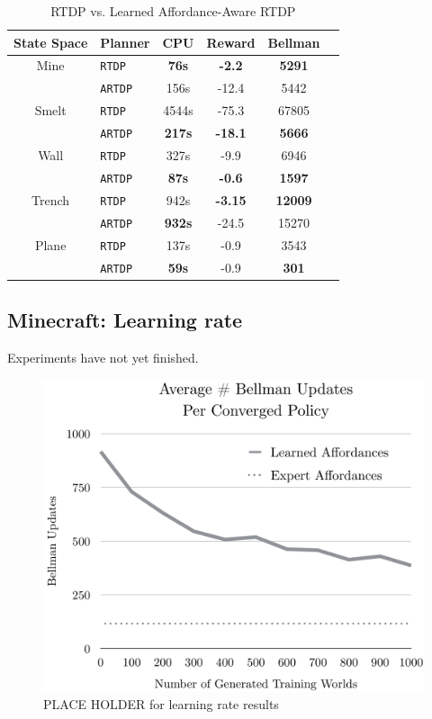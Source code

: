 \documentclass[conference]{IEEEtran}
\begin{document}
\begin{table}[H]
\centering
\begin{tabular}{ c l  || c c c c}
  State Space	&	Planner 				&	CPU	&	Reward 	& Bellman \\ \hline
  Mine 	& \texttt{RTDP}  			& 	{\bf 76s}	&	{\bf -2.2}	&	{\bf 5291}		\\
  		& \texttt{ARTDP}  			& 	156s		&	-12.4		&	5442		\\  \hline
  Smelt	&	\texttt{RTDP}  			& 	4544s	&	-75.3		&	67805		\\
  		&	\texttt{ARTDP}  		& 	{\bf 217s}	&	{\bf -18.1}	&	{\bf 5666}		\\  \hline
  Wall	&	\texttt{RTDP}  			& 	327s		&	-9.9		&	6946		\\
  		&	\texttt{ARTDP}  		& 	{\bf 87s}	&	{\bf -0.6}	&	{\bf 1597}		\\  \hline
  Trench	&	\texttt{RTDP}  			& 	942s		&	{\bf -3.15}	&	{\bf 12009}		\\
  		&	\texttt{ARTDP}  		& 	{\bf 932s}	&	-24.5		&	15270		\\ \hline
Plane	&	\texttt{RTDP}  			& 	137s		&	-0.9		&	3543		\\
  		&	\texttt{ARTDP}  		& 	{\bf 59s}	&	-0.9		&	{\bf 301}		\\ 
\end{tabular}
\caption{RTDP vs. Learned Affordance-Aware RTDP}
\label{table:minecraft_results}
\end{table}


\subsection{Minecraft: Learning rate}

Experiments have not yet finished.

\begin{figure}[H]
\centering
\includegraphics[scale=0.195]{figures/training_results.png}%
  \caption{PLACE HOLDER for learning rate results}
  \label{fig:training_results}
\end{figure}
\end{document}
